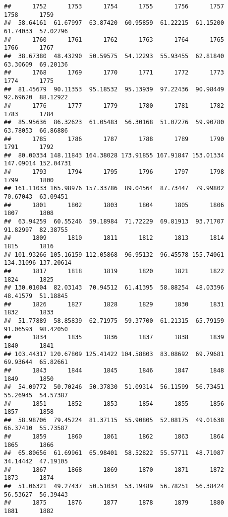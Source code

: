 \documentclass[
]{article}
\begin{document}
\begin{verbatim}
##      1752      1753      1754      1755      1756      1757      1758      1759 
##  58.64161  61.67997  63.87420  60.95859  61.22215  61.15200  61.74033  57.02796 
##      1760      1761      1762      1763      1764      1765      1766      1767 
##  38.67380  48.43290  50.59575  54.12293  55.93455  62.81840  63.30609  69.20136 
##      1768      1769      1770      1771      1772      1773      1774      1775 
##  81.45679  90.11353  95.18532  95.13939  97.22436  90.98449  92.69620  88.12922 
##      1776      1777      1779      1780      1781      1782      1783      1784 
##  85.95636  86.32623  61.05483  56.30168  51.07276  59.90780  63.78053  66.86886 
##      1785      1786      1787      1788      1789      1790      1791      1792 
##  80.00334 148.11843 164.38028 173.91855 167.91847 153.01334 147.09014 152.04731 
##      1793      1794      1795      1796      1797      1798      1799      1800 
## 161.11033 165.98976 157.33786  89.04564  87.73447  79.99802  70.67043  63.09451 
##      1801      1802      1803      1804      1805      1806      1807      1808 
##  63.94259  60.55246  59.18984  71.72229  69.81913  93.71707  91.82997  82.38755 
##      1809      1810      1811      1812      1813      1814      1815      1816 
## 101.93266 105.16159 112.05868  96.95132  96.45578 155.74061 134.31096 137.20614 
##      1817      1818      1819      1820      1821      1822      1824      1825 
## 130.01004  82.03143  70.94512  61.41395  58.88254  48.03396  48.41579  51.18845 
##      1826      1827      1828      1829      1830      1831      1832      1833 
##  51.77889  58.85839  62.71975  59.37700  61.21315  65.79159  91.06593  98.42050 
##      1834      1835      1836      1837      1838      1839      1840      1841 
## 103.44317 120.67809 125.41422 104.58803  83.08692  69.79681  69.93644  65.82661 
##      1843      1844      1845      1846      1847      1848      1849      1850 
##  54.09772  50.70246  50.37830  51.09314  56.11599  56.73451  55.26945  54.57387 
##      1851      1852      1853      1854      1855      1856      1857      1858 
##  58.98706  79.45224  81.37115  55.90805  52.08175  49.01638  66.37410  55.73587 
##      1859      1860      1861      1862      1863      1864      1865      1866 
##  65.80656  61.69961  65.98401  58.52822  55.57711  48.71087  34.14442  47.19105 
##      1867      1868      1869      1870      1871      1872      1873      1874 
##  51.06321  49.27437  50.51034  53.19489  56.78251  56.38424  56.53627  56.39443 
##      1875      1876      1877      1878      1879      1880      1881      1882 

\end{verbatim}
\end{document}
